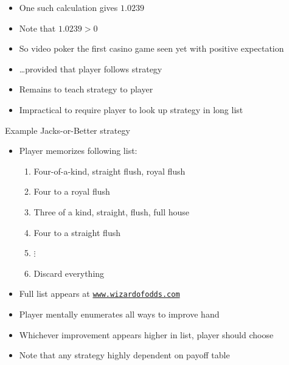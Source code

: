 \documentclass[handout,xcolor=dvipsnames]{beamer}
\theoremstyle{definition}
\begin{document}
\begin{frame}
\begin{itemize}
\item One such calculation gives $1.0239$
\item Note that $1.0239>0$
\item So video poker the first casino game seen
yet with positive expectation
\item \dots provided that player follows strategy
\item Remains to teach strategy to player
\item Impractical to require player to look up strategy
in long list
\end{itemize}
\end{frame}

\begin{frame}{Example Jacks-or-Better strategy}
\begin{itemize}
\item Player memorizes following list:
\begin{enumerate}
\item Four-of-a-kind, straight flush, royal flush
\item Four to a royal flush
\item Three of a kind, straight, flush, full house
\item Four to a straight flush
\item[]$\vdots$
\setcounter{enumi}{15}
\item Discard everything
\end{enumerate}
\item Full list appears at \href{http://wizardofodds.com/games/video-poker/strategy/jacks-or-better/9-6/simple}{\color{blue}\tt www.wizardofodds.com}
\item Player mentally enumerates all ways to improve hand
\item Whichever improvement appears higher in list,
player should choose
\item Note that any strategy highly dependent
on payoff table
\end{itemize}
\end{frame}
\end{document}
